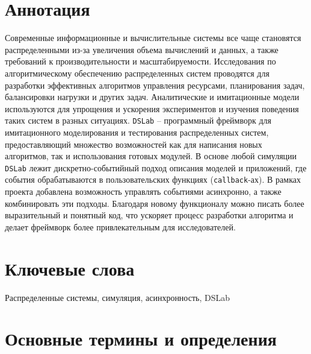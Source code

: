 
\section*{Аннотация}

Современные информационные и вычислительные системы все чаще становятся распределенными из-за увеличения объема вычислений и данных, а также требований к производительности и масштабируемости. Исследования по алгоритмическому обеспечению распределенных систем проводятся для разработки эффективных алгоритмов управления ресурсами, планирования задач, балансировки нагрузки и других задач. Аналитические и имитационные модели используются для упрощения и ускорения экспериментов и изучения поведения таких систем в разных ситуациях.
\texttt{DSLab} -- программный фреймворк для имитационного моделирования и тестирования распределенных систем, предоставляющий множество возможностей как для написания новых алгоритмов, так и использования готовых модулей. В основе любой симуляции \texttt{DSLab} лежит дискретно-событийный подход описания моделей и приложений, где события обрабатываются в пользовательских функциях (\texttt{callback}-ах). В рамках проекта добавлена возможность управлять событиями асинхронно, а также комбинировать эти подходы. Благодаря новому функционалу можно писать более выразительный и понятный код, что ускоряет процесс разработки алгоритма и делает фреймворк более привлекательным для исследователей. 

\section*{Ключевые слова}

Распределенные системы, симуляция, асинхронность, DSLab


\newpage 

\section{Основные термины и определения}

